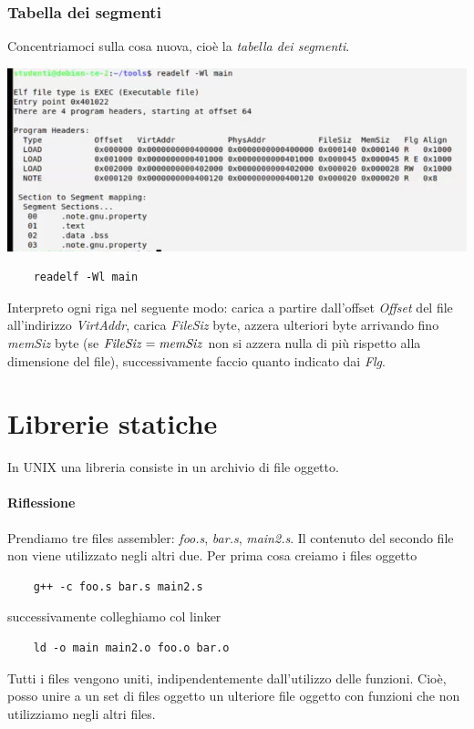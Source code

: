 \subsubsection{Tabella dei segmenti} Concentriamoci sulla cosa nuova, cioè la \emph{tabella dei segmenti}. \begin{center}
	\includegraphics{img/60.PNG}
\end{center}  
\begin{verbatim}
	readelf -Wl main
\end{verbatim}
Interpreto ogni riga nel seguente modo: carica a partire dall'offset \emph{Offset} del file all'indirizzo \emph{VirtAddr}, carica \emph{FileSiz} byte, azzera ulteriori byte arrivando fino \emph{memSiz} byte (se $\text{\emph{FileSiz}} = \text{\emph{memSiz}}$ non si azzera nulla di più rispetto alla dimensione del file), successivamente faccio quanto indicato dai \emph{Flg}.

\section{Librerie statiche}
In UNIX una libreria consiste in un archivio di file oggetto.
\paragraph{Riflessione} Prendiamo tre files assembler: \emph{foo.s}, \emph{bar.s}, \emph{main2.s}. Il contenuto del secondo file non viene utilizzato negli altri due. Per prima cosa creiamo i files oggetto
\begin{verbatim}
	g++ -c foo.s bar.s main2.s
\end{verbatim}
successivamente colleghiamo col linker
\begin{verbatim}
	ld -o main main2.o foo.o bar.o
\end{verbatim}
Tutti i files vengono uniti, indipendentemente dall'utilizzo delle funzioni. Cioè, posso unire a un set di files oggetto un ulteriore file oggetto con funzioni che non utilizziamo negli altri files.
